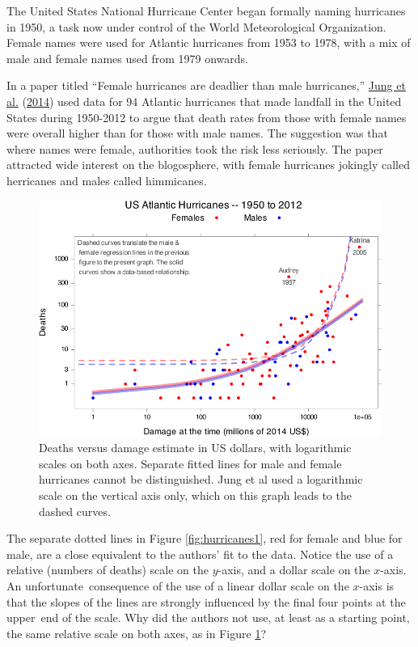 \documentclass[
  10pt,
  b5paper]{book}
\begin{document}
The United States National Hurricane Center began formally naming
hurricanes in 1950, a task now under control of the
World Meteorological Organization. Female names were used for
Atlantic hurricanes from 1953 to 1978, with a mix of male and
female names used from 1979 onwards.

In a paper titled ``Female hurricanes are deadlier than male
hurricanes,'' \protect\hyperlink{ref-jung2014female}{Jung et al.} (\protect\hyperlink{ref-jung2014female}{2014}) used data for 94 Atlantic hurricanes
that made landfall in the United States during 1950-2012 to argue
that death rates from those with female names were overall higher
than for those with male names. The suggestion was that where names
were female, authorities took the risk less seriously. The paper
attracted wide interest on the blogosphere, with female hurricanes
jokingly called herricanes and males called himmicanes.

\begin{figure}[H]

{\centering \includegraphics[width=0.85\linewidth]{08-observational_files/figure-latex/hurricanes2-1} 

}

\caption{Deaths versus damage estimate in US dollars, with logarithmic scales
               on both axes. Separate fitted lines for male and female
               hurricanes cannot be distinguished. Jung et al used a 
               logarithmic scale on the vertical axis only, which on
               this graph leads to the dashed curves.}\label{fig:hurricanes2}
\end{figure}

The separate dotted lines in Figure \ref{fig:hurricanes1}, red for
female and blue for male, are a close equivalent to the authors' fit
to the data. Notice the use of a relative (numbers of deaths) scale
on the \(y\)-axis, and a dollar scale on the \(x\)-axis.
An unfortunate~consequence of the use of a linear dollar scale
on the \(x\)-axis is that the slopes of the lines are strongly
influenced by the final four points at the upper~end of the scale.
Why did the authors not use, at least as a starting point, the same relative scale on both axes, as in Figure
\ref{fig:hurricanes2}?
\end{document}
